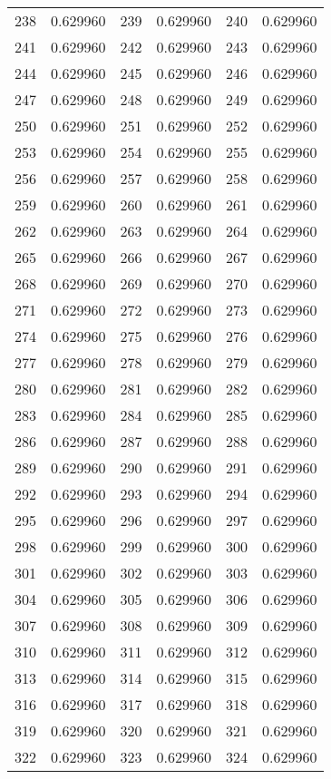 \documentclass[12pt]{article}
\begin{document}
\begin{longtable}{@{}cc|cc|cc@{}}
238 & 0.629960 & 239 & 0.629960 & 240 & 0.629960 \\
241 & 0.629960 & 242 & 0.629960 & 243 & 0.629960 \\
244 & 0.629960 & 245 & 0.629960 & 246 & 0.629960 \\
247 & 0.629960 & 248 & 0.629960 & 249 & 0.629960 \\
250 & 0.629960 & 251 & 0.629960 & 252 & 0.629960 \\
253 & 0.629960 & 254 & 0.629960 & 255 & 0.629960 \\
256 & 0.629960 & 257 & 0.629960 & 258 & 0.629960 \\
259 & 0.629960 & 260 & 0.629960 & 261 & 0.629960 \\
262 & 0.629960 & 263 & 0.629960 & 264 & 0.629960 \\
265 & 0.629960 & 266 & 0.629960 & 267 & 0.629960 \\
268 & 0.629960 & 269 & 0.629960 & 270 & 0.629960 \\
271 & 0.629960 & 272 & 0.629960 & 273 & 0.629960 \\
274 & 0.629960 & 275 & 0.629960 & 276 & 0.629960 \\
277 & 0.629960 & 278 & 0.629960 & 279 & 0.629960 \\
280 & 0.629960 & 281 & 0.629960 & 282 & 0.629960 \\
283 & 0.629960 & 284 & 0.629960 & 285 & 0.629960 \\
286 & 0.629960 & 287 & 0.629960 & 288 & 0.629960 \\
289 & 0.629960 & 290 & 0.629960 & 291 & 0.629960 \\
292 & 0.629960 & 293 & 0.629960 & 294 & 0.629960 \\
295 & 0.629960 & 296 & 0.629960 & 297 & 0.629960 \\
298 & 0.629960 & 299 & 0.629960 & 300 & 0.629960 \\
301 & 0.629960 & 302 & 0.629960 & 303 & 0.629960 \\
304 & 0.629960 & 305 & 0.629960 & 306 & 0.629960 \\
307 & 0.629960 & 308 & 0.629960 & 309 & 0.629960 \\
310 & 0.629960 & 311 & 0.629960 & 312 & 0.629960 \\
313 & 0.629960 & 314 & 0.629960 & 315 & 0.629960 \\
316 & 0.629960 & 317 & 0.629960 & 318 & 0.629960 \\
319 & 0.629960 & 320 & 0.629960 & 321 & 0.629960 \\
322 & 0.629960 & 323 & 0.629960 & 324 & 0.629960 \\

\end{longtable}
\end{document}
